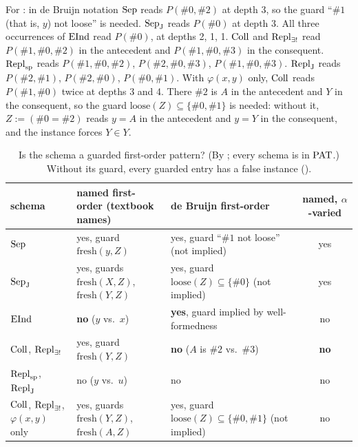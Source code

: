 For : in de Bruijn notation $\mathrm{Sep}$ reads $P(\#0,\#2)$ at depth 3, so the guard ``$\#1$ (that is,
$y$) not loose'' is needed. $\mathrm{Sep}_{\mathrm J}$ reads $P(\#0)$ at depth 3. All three occurrences of $\mathrm{EInd}$ read
$P(\#0)$, at depths 2, 1, 1. $\mathrm{Coll}$ and $\mathrm{Repl}_{\exists!}$ read $P(\#1,\#0,\#2)$ in the antecedent and $P(\#1,\#0,\#3)$ in the
consequent. $\mathrm{Repl}_{\mathrm{sp}}$ reads $P(\#1,\#0,\#2)$, $P(\#2,\#0,\#3)$, $P(\#1,\#0,\#3)$. $\mathrm{Repl}_{\mathrm{J}}$ reads $P(\#2,\#1)$,
$P(\#2,\#0)$, $P(\#0,\#1)$. With $\varphi(x,y)$ only, $\mathrm{Coll}$ reads $P(\#1,\#0)$ twice at depths 3 and 4. There $\#2$ is
$A$ in the antecedent and $Y$ in the consequent, so the guard $\mathrm{loose}(Z)\subseteq\{\#0,\#1\}$ is needed: without
it, $Z:=(\#0=\#2)$ reads $y=A$ in the antecedent and $y=Y$ in the consequent, and the instance forces $Y\in Y$.

\begin{table}[t]
\centering\small
\begin{tabularx}{\textwidth}{@{}l >{\raggedright\arraybackslash}X >{\raggedright\arraybackslash}X c@{}}
\toprule
schema & named first-order (textbook names) & de Bruijn first-order & named, $\alpha$-varied\\
\midrule
$\mathrm{Sep}$ & yes, guard $\mathrm{fresh}(y,Z)$ & yes, guard ``$\#1$ not loose'' (not implied) & yes\\
$\mathrm{Sep}_{\mathrm J}$ & yes, guards $\mathrm{fresh}(X,Z)$, $\mathrm{fresh}(Y,Z)$ & yes, guard
  $\mathrm{loose}(Z)\subseteq\{\#0\}$ (not implied) & yes\\
$\mathrm{EInd}$ & \textbf{no} ($y$ vs.\ $x$) & \textbf{yes}, guard implied by well-formedness & no\\
$\mathrm{Coll}$, $\mathrm{Repl}_{\exists!}$ & yes, guard $\mathrm{fresh}(Y,Z)$ & \textbf{no} ($A$ is $\#2$ vs.\ $\#3$) & \textbf{no}\\
$\mathrm{Repl}_{\mathrm{sp}}$, $\mathrm{Repl}_{\mathrm{J}}$ & no ($y$ vs.\ $u$) & no & no\\
$\mathrm{Coll}$, $\mathrm{Repl}_{\exists!}$, $\varphi(x,y)$ only & yes, guards $\mathrm{fresh}(Y,Z)$, $\mathrm{fresh}(A,Z)$ & yes, guard
  $\mathrm{loose}(Z)\subseteq\{\#0,\#1\}$ (not implied) & no\\
\bottomrule
\end{tabularx}
\caption[Which ZF schemas are first-order patterns]{Is the schema a guarded first-order pattern? (By
; every schema is in $\mathrm{PAT}$.) Without its guard, every guarded entry has a false
instance ().}
\label{tab:zf:classify}
\end{table}

